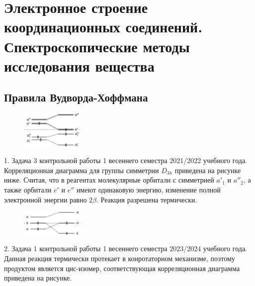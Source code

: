 \section[Спектроскопические методы исследования вещества]{\texorpdfstring{Электронное строение координационных соединений.\\Спектроскопические методы исследования вещества}{Электронное строение координационных соединений. Спектроскопические методы исследования вещества}}
\subsection{Правила Вудворда-Хоффмана}
\begin{figure} %
    \centering
    \vspace{1.8mm}
    \includegraphics[width=30mm]{images/Fig_2_1_1_dec.png}
    \vspace{-5mm}
\end{figure}
1. Задача 3 контрольной работы 1 весеннего семестра 2021/2022 учебного года. Корреляционная диаграмма для группы симметрии $D_{3h}$ приведена на рисунке ниже.  Считая, что в реагентах молекулярные орбитали с симметрией $a'_1$ и $a''_2$, а также орбитали $e'$ и $e''$ имеют одинаковую энергию, изменение полной электронной энергии равно $2\beta$. Реакция разрешена термически.\par
\begin{figure} %
    \centering
    \vspace{-2.2mm}
    \includegraphics[width=30mm]{images/Fig_2_1_2_dec.png}
    \vspace{-5mm}
\end{figure}
2. Задача 1 контрольной работы 1 весеннего семестра 2023/2024 учебного года. Данная реакция термически протекает в конротаторном механизме, поэтому продуктом является цис-изомер, соответствующая корреляционная диаграмма приведена на рисунке.\par
